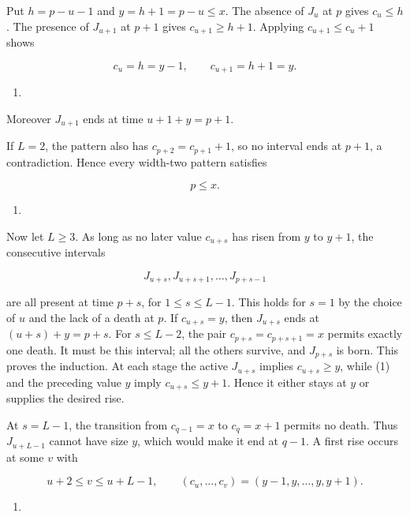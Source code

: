 \documentclass[11pt,a4paper]{article}
\providecommand{\tightlist}{\setlength{\itemsep}{0pt}\setlength{\parskip}{0pt}}
\begin{document}
Put \(h=p-u-1\) and \(y=h+1=p-u\le x\). The absence of \(J_u\) at \(p\) gives \(c_u\le h\). The presence of \(J_{u+1}\) at \(p+1\) gives \(c_{u+1}\ge h+1\). Applying \(c_{u+1}\le c_u+1\) shows

\[
c_u=h=y-1,\qquad c_{u+1}=h+1=y.
\]

\begin{enumerate}
\def\labelenumi{(\arabic{enumi})}
\setcounter{enumi}{2}
\tightlist
\item
\end{enumerate}

Moreover \(J_{u+1}\) ends at time \(u+1+y=p+1\).

If \(L=2\), the pattern also has \(c_{p+2}=c_{p+1}+1\), so no interval ends at \(p+1\), a contradiction. Hence every width-two pattern satisfies

\[
p\le x.
\]

\begin{enumerate}
\def\labelenumi{(\arabic{enumi})}
\setcounter{enumi}{3}
\tightlist
\item
\end{enumerate}

Now let \(L\ge3\). As long as no later value \(c_{u+s}\) has risen from \(y\) to \(y+1\), the consecutive intervals

\[
J_{u+s},J_{u+s+1},\ldots,J_{p+s-1}
\]

are all present at time \(p+s\), for \(1\le s\le L-1\). This holds for \(s=1\) by the choice of \(u\) and the lack of a death at \(p\). If \(c_{u+s}=y\), then \(J_{u+s}\) ends at \((u+s)+y=p+s\). For \(s\le L-2\), the pair \(c_{p+s}=c_{p+s+1}=x\) permits exactly one death. It must be this interval; all the others survive, and \(J_{p+s}\) is born. This proves the induction. At each stage the active \(J_{u+s}\) implies \(c_{u+s}\ge y\), while (1) and the preceding value \(y\) imply \(c_{u+s}\le y+1\). Hence it either stays at \(y\) or supplies the desired rise.

At \(s=L-1\), the transition from \(c_{q-1}=x\) to \(c_q=x+1\) permits no death. Thus \(J_{u+L-1}\) cannot have size \(y\), which would make it end at \(q-1\). A first rise occurs at some \(v\) with

\[
u+2\le v\le u+L-1,
\qquad(c_u,\ldots,c_v)=(y-1,y,\ldots,y,y+1).
\]

\begin{enumerate}
\def\labelenumi{(\arabic{enumi})}
\setcounter{enumi}{4}
\tightlist
\item
\end{enumerate}
\end{document}
